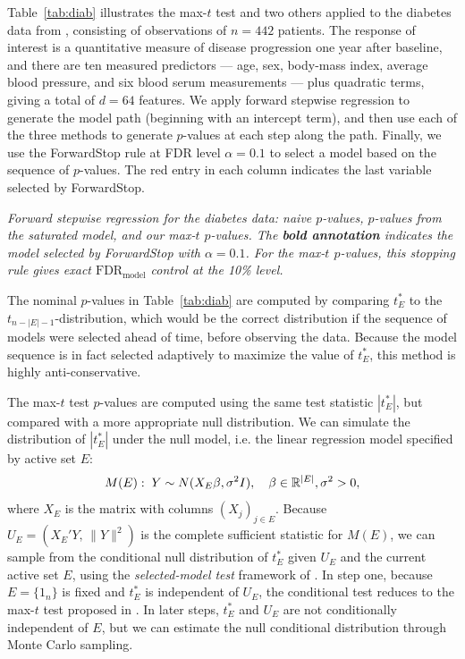 \documentclass{article}
\begin{document}
Table~\ref{tab:diab} illustrates the max-$t$ test and two others applied to the diabetes data from \cite{LARS}, consisting of observations of $n=442$ patients. The response of interest is a quantitative measure of disease progression one year after baseline, and there are ten measured predictors --- age, sex, body-mass index, average blood pressure, and six blood serum measurements --- plus quadratic terms, giving a total of $d=64$ features. We apply forward stepwise regression to generate the model path (beginning with an intercept term), and then use each of the three methods to generate $p$-values at each step along the path. Finally, we use the ForwardStop rule \citep{gsell2013sequential} at FDR level $\alpha=0.1$ to select a model based on the sequence of $p$-values. The red entry in each column indicates the last variable selected by ForwardStop.

\begin{table}[ht]
\centering

\caption[tab:diab]{\em Forward stepwise regression for the diabetes data: naive $p$-values, $p$-values from the saturated model, and our max-$t$ $p$-values. The {\bf bold annotation} indicates the model selected by ForwardStop with $\alpha=0.1$. For the max-$t$ $p$-values, this stopping rule gives exact $\text{FDR}_{\text{model}}$ control at the 10\% level.}
\label{tab:diab}
\end{table}

The nominal $p$-values in Table~\ref{tab:diab} are computed by comparing $t_E^*$ to the $t_{n-|E|-1}$-distribution, which would be the correct distribution if the sequence of models were selected ahead of time, before observing the data. Because the model sequence is in fact selected adaptively to maximize the value of $t_E^*$, this method is highly anti-conservative.

The max-$t$ test $p$-values are computed using the same test statistic $|t_E^*|$, but compared with a more appropriate null distribution. We can simulate the distribution of $|t_E^*|$ under the null model, i.e. the linear regression model specified by active set $E$:
\begin{equation}
  M(E):\; Y \sim N(X_E\beta, \sigma^2 I), \quad \beta\in \mathbb{R}^{|E|}, \sigma^2>0,
\end{equation}
where $X_E$ is the matrix with columns $(X_j)_{j\in E}$. Because $U_E=\left(X_E'Y,\, \|Y\|^2\right)$ is the complete sufficient statistic for $M(E)$, we can sample from the conditional null distribution of $t_E^*$ given $U_E$ and the current active set $E$, using the {\em selected-model test} framework of \citet{fithian2014optimal}. In step one, because $E=\{1_n\}$ is fixed and $t_E^*$ is independent of $U_E$, the conditional test reduces to the max-$t$ test proposed in \citet{buja2014}. In later steps, $t_E^*$ and $U_E$ are not conditionally independent of $E$, but we can estimate the null conditional distribution through Monte Carlo sampling.
\end{document}
